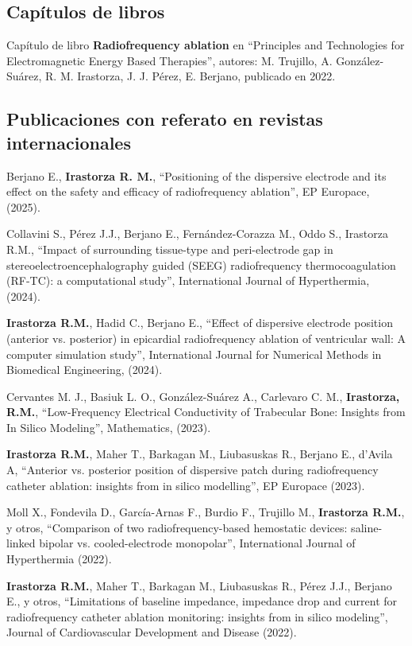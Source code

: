 \documentclass[margin,line]{res}
\begin{document}
\begin{resume}
\subsection{ Capítulos de libros} 

Capítulo de libro \textbf{Radiofrequency ablation} en ``Principles and Technologies for Electromagnetic Energy Based Therapies'', autores: M. Trujillo, A. González-Suárez, R. M. Irastorza, J. J. Pérez, E. Berjano, publicado en 2022.


\subsection{ Publicaciones con referato en revistas internacionales}

Berjano E., {\bf Irastorza R. M.}, ``Positioning of the dispersive electrode and its effect on the safety and efficacy of radiofrequency ablation'', EP Europace, (2025).

Collavini S., Pérez J.J., Berjano E., Fernández-Corazza M., Oddo S., {Irastorza R.M.},
``Impact of surrounding tissue-type and peri-electrode gap in stereoelectroencephalography guided (SEEG) radiofrequency thermocoagulation (RF-TC): a computational study'', International Journal of Hyperthermia, (2024).

{\bf Irastorza R.M.}, Hadid C., Berjano E., ``Effect of dispersive electrode position (anterior vs. posterior) in epicardial radiofrequency ablation of ventricular wall: A computer simulation study'', International Journal for Numerical Methods in Biomedical Engineering, (2024).

Cervantes M. J., Basiuk L. O., González-Suárez A., Carlevaro C. M., \textbf{Irastorza, R.M.}, ``Low-Frequency Electrical Conductivity of Trabecular Bone: Insights from In Silico Modeling'', Mathematics, (2023).

\textbf{Irastorza R.M.}, Maher T., Barkagan M., Liubasuskas R., Berjano E., d’Avila A, ``Anterior vs. posterior position of dispersive patch during radiofrequency catheter ablation: insights from in silico modelling'', EP Europace (2023).

Moll X., Fondevila D., García-Arnas F., Burdio F., Trujillo M., \textbf{Irastorza R.M.}, y otros, ``Comparison of two radiofrequency-based hemostatic devices: saline-linked bipolar vs. cooled-electrode monopolar'', International Journal of Hyperthermia (2022).

\textbf{Irastorza R.M.}, Maher T., Barkagan M., Liubasuskas R., Pérez J.J., Berjano E., y otros, ``Limitations of baseline impedance, impedance drop and current for radiofrequency catheter ablation monitoring: insights from in silico modeling'', Journal of Cardiovascular Development and Disease (2022).


\end{resume}
\end{document}
